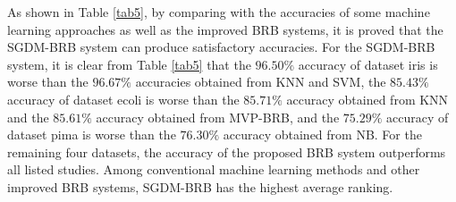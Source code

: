 \documentclass{ieeeaccess}
\begin{document}
As shown in Table \ref{tab5}, by comparing with the accuracies of some machine learning approaches as well as the improved BRB systems, it is proved that the SGDM-BRB system can produce satisfactory accuracies.
For the SGDM-BRB system, it is clear from Table \ref{tab5} that
the $96.50\%$ accuracy of dataset iris is worse than the $96.67\%$ accuracies obtained from KNN and SVM,
the $85.43\%$ accuracy of dataset ecoli is worse than the $85.71\%$ accuracy obtained from KNN and the $85.61\%$ accuracy obtained from MVP-BRB,
and the $75.29\%$ accuracy of dataset pima is worse than the $76.30\%$ accuracy obtained from NB.
For the remaining four datasets, the accuracy of the proposed BRB system outperforms all listed studies.
Among conventional machine learning methods and other improved BRB systems, SGDM-BRB has the highest average ranking.
\end{document}
